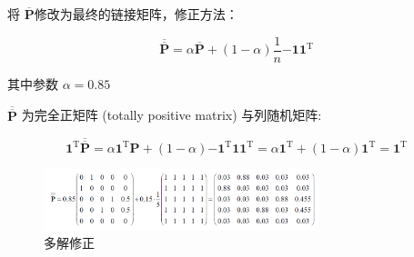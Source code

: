 \documentclass[12pt, a4paper, oneside]{ctexbook}
\begin{document}
\noindent 将 $\overline{\mathbf{P}}$修改为最终的链接矩阵，修正方法：

$$\overline{\overline{\mathbf{P}}}=\alpha\overline{\mathbf{P}}+(1-\alpha)\frac{1}{n}{\mathbf{-}}\mathbf{11}^{\mathrm{T}}$$ 

其中参数 $\alpha=0.85$

$\overline{\overline{\mathbf{P}}}$ 为完全正矩阵 (totally positive matrix) 与列随机矩阵:

$$\mathbf{1} ^{\mathrm{T} }\overline{\overline{\mathbf{P}}} = \alpha\mathbf{1} ^{\mathrm{T} }\mathbf{P} + ( 1- \alpha) \mathbf{- } \mathbf{1} ^{\mathrm{T} }\mathbf{1} \mathbf{1} ^{\mathrm{T} }= \alpha\mathbf{1} ^{\mathrm{T} }+ ( 1- \alpha) \mathbf{1} ^{\mathrm{T} }= \mathbf{1} ^{\mathrm{T} }$$

\begin{figure}[H]
    \centering
    \includegraphics[width = 8cm]{assets/多解修正.png}
    \caption{多解修正}
\end{figure}
\end{document}
